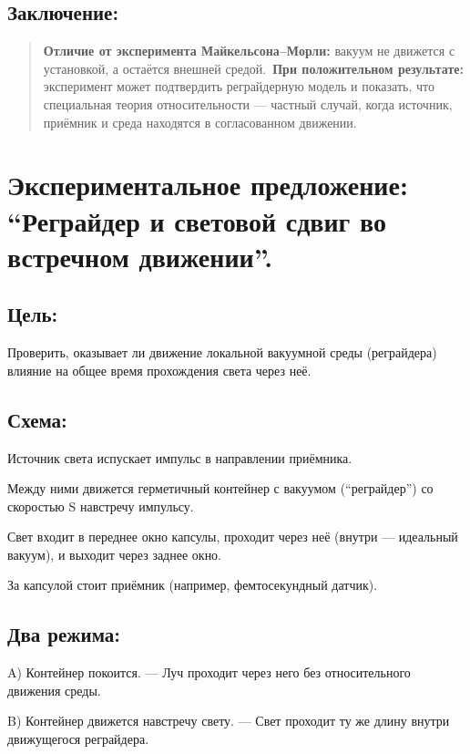 \documentclass[12pt]{article}
\begin{document}
\subsection*{Заключение:}
\begin{quote}
\textbf{Отличие от эксперимента Майкельсона–Морли:} вакуум не движется с установкой, а остаётся внешней средой.\
\textbf{При положительном результате:} эксперимент может подтвердить реграйдерную модель и показать, что специальная теория относительности — частный случай, когда источник, приёмник и среда находятся в согласованном движении.
\end{quote}

\section*{Экспериментальное предложение: “Реграйдер и световой сдвиг во встречном движении”.}

\subsection*{Цель:}
Проверить, оказывает ли движение локальной вакуумной среды (реграйдера) влияние на общее время прохождения света через неё.

\subsection*{Схема:}
Источник света испускает импульс в направлении приёмника.

Между ними движется герметичный контейнер с вакуумом (“реграйдер”) со скоростью S навстречу импульсу.

Свет входит в переднее окно капсулы, проходит через неё (внутри — идеальный вакуум), и выходит через заднее окно.

За капсулой стоит приёмник (например, фемтосекундный датчик).


\subsection*{Два режима:}
\par
A) Контейнер покоится.
— Луч проходит через него без относительного движения среды.
\par
B) Контейнер движется навстречу свету.
— Свет проходит ту же длину внутри движущегося реграйдера.
\end{document}

